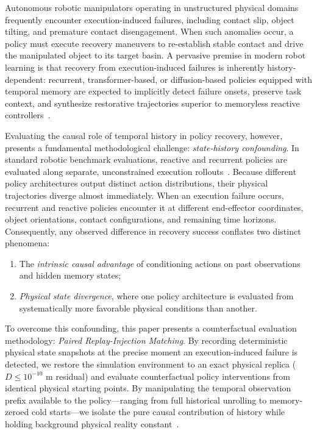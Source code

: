\documentclass[letterpaper, 10 pt, conference]{ieeeconf}
\begin{document}
Autonomous robotic manipulators operating in unstructured physical domains frequently encounter execution-induced failures, including contact slip, object tilting, and premature contact disengagement. When such anomalies occur, a policy must execute recovery maneuvers to re-establish stable contact and drive the manipulated object to its target basin. A pervasive premise in modern robot learning is that recovery from execution-induced failures is inherently history-dependent: recurrent, transformer-based, or diffusion-based policies equipped with temporal memory are expected to implicitly detect failure onsets, preserve task context, and synthesize restorative trajectories superior to memoryless reactive controllers~\cite{liu2024roborecover, kumar2021rma}.

Evaluating the causal role of temporal history in policy recovery, however, presents a fundamental methodological challenge: \emph{state-history confounding}. In standard robotic benchmark evaluations, reactive and recurrent policies are evaluated along separate, unconstrained execution rollouts~\cite{liu2023libero}. Because different policy architectures output distinct action distributions, their physical trajectories diverge almost immediately. When an execution failure occurs, recurrent and reactive policies encounter it at different end-effector coordinates, object orientations, contact configurations, and remaining time horizons. Consequently, any observed difference in recovery success conflates two distinct phenomena:
\begin{enumerate}
    \item The \emph{intrinsic causal advantage} of conditioning actions on past observations and hidden memory states;
    \item \emph{Physical state divergence}, where one policy architecture is evaluated from systematically more favorable physical conditions than another.
\end{enumerate}

To overcome this confounding, this paper presents a counterfactual evaluation methodology: \emph{Paired Replay-Injection Matching}. By recording deterministic physical state snapshots at the precise moment an execution-induced failure is detected, we restore the simulation environment to an exact physical replica ($D \le 10^{-10}\text{ m}$ residual) and evaluate counterfactual policy interventions from identical physical starting points. By manipulating the temporal observation prefix available to the policy---ranging from full historical unrolling to memory-zeroed cold starts---we isolate the pure causal contribution of history while holding background physical reality constant~\cite{pearl2009causality}.
\end{document}
